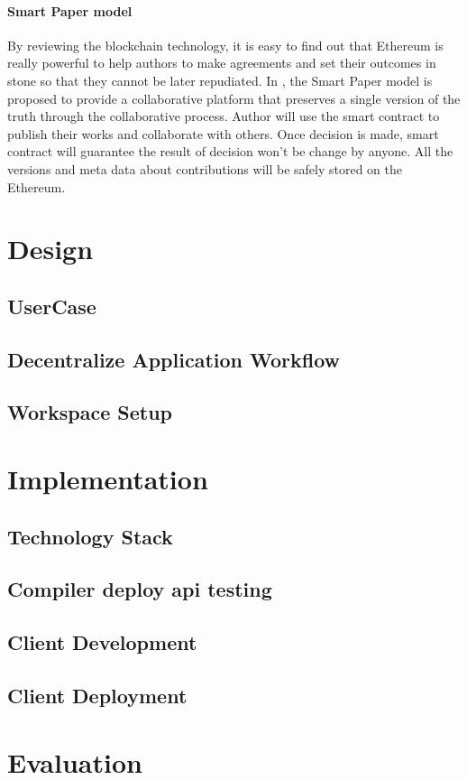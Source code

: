 \documentclass [12pt]{article}
\begin{document}
\paragraph{Smart Paper model}
By reviewing the blockchain technology, it is easy to find out that Ethereum is really powerful to
help authors to make agreements and set their outcomes in stone so that they cannot be later repudiated.
In \cite{Khoe:1994:CML:2288694.2294265}, 
the Smart Paper model is proposed to provide a collaborative platform 
that preserves a single version of the truth through the collaborative process. 
Author will use the smart contract to publish their works and collaborate with others.
Once decision is made, smart contract will guarantee the result of decision won't be change by anyone.
All the versions and meta data about contributions will be safely stored on the Ethereum.
\section{Design}
\subsection{UserCase}
\subsection{Decentralize Application Workflow }
\subsection{Workspace Setup}
\section{Implementation}
\subsection{Technology Stack}
\subsection{Compiler deploy api testing}
\subsection{Client Development}
\subsection{Client Deployment}
\section{Evaluation}
\end{document}
